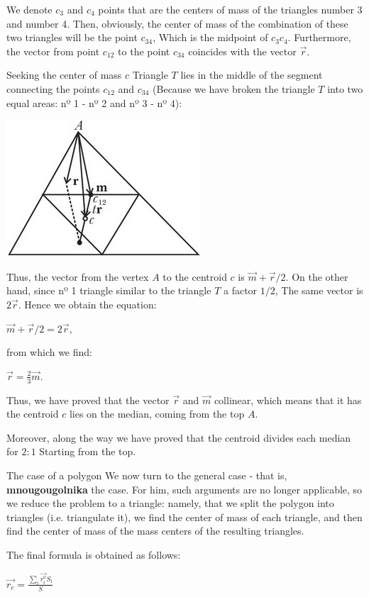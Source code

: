 We denote $c_3$ and $c_4$ points that are the centers of mass of the triangles number 3 and number 4. Then, obviously, the center of mass of the combination of these two triangles will be the point $c_ {34}$, Which is the midpoint of $c_3 c_4$. Furthermore, the vector from point $c_ {12}$ to the point $c_ {34}$ coincides with the vector $\vec {r}$.

Seeking the center of mass $c$ Triangle $T$ lies in the middle of the segment connecting the points $c_ {12}$ and $c_ {34}$ (Because we have broken the triangle $T$ into two equal areas: nº 1 - nº 2 and nº 3 - nº 4):

\includegraphics[scale=0.5]{4.jpg}

Thus, the vector from the vertex $A$ to the centroid $c$ is $\vec {m} + \vec {r} / 2$. On the other hand, since nº 1 triangle similar to the triangle $T$ a factor $1/2$, The same vector is $2 \vec {r}$. Hence we obtain the equation:

$\vec {m} + \vec {r} / 2 = 2 \vec {r},$

from which we find:

$\vec {r} = \frac {2} {3} \vec {m}.$

Thus, we have proved that the vector $\vec {r}$ and $\vec {m}$ collinear, which means that it has the centroid $c$ lies on the median, coming from the top $A$.

Moreover, along the way we have proved that the centroid divides each median for $2:1$ Starting from the top.

The case of a polygon
We now turn to the general case - that is, \textbf{mnougougolnika} the case. For him, such arguments are no longer applicable, so we reduce the problem to a triangle: namely, that we split the polygon into triangles (i.e. triangulate it), we find the center of mass of each triangle, and then find the center of mass of the mass centers of the resulting triangles.

The final formula is obtained as follows:

$\vec{r_{c}}=\frac{\sum_{i}\vec{r_{i}^{\text{o}}}S_{i}}{S}$

